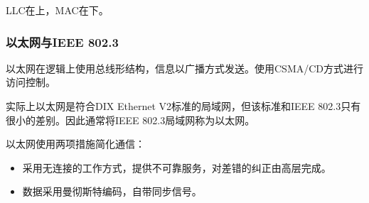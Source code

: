 \documentclass[12pt, a4paper, oneside]{ctexart}
\begin{document}
LLC在上，MAC在下。

\subsubsection{以太网与IEEE 802.3}

以太网在逻辑上使用总线形结构，信息以广播方式发送。使用CSMA/CD方式进行访问控制。

实际上以太网是符合DIX Ethernet V2标准的局域网，但该标准和IEEE 802.3只有很小的差别。因此通常将IEEE 802.3局域网称为以太网。

以太网使用两项措施简化通信：
\begin{itemize}
    \item 采用无连接的工作方式，提供不可靠服务，对差错的纠正由高层完成。
    \item 数据采用曼彻斯特编码，自带同步信号。
\end{itemize}
\end{document}
